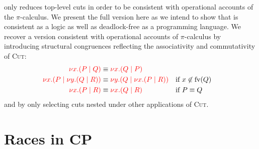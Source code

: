 \documentclass[a4paper,UKenglish]{lipics-v2016}
\begin{document}
only reduces top-level cuts in order to be consistent with operational
accounts of the $\pi$-calculus.
%
We present the full version here as we intend to show that \nodcap is consistent
as a logic as well as deadlock-free as a programming language.
%
We recover a version consistent with operational accounts of $\pi$-calculus by
introducing structural congruences reflecting the associativity and
commutativity of \textsc{Cut}:
\begin{align*}
  \textcolor{red}{{\nu x.} (P \mid Q)} &\equiv \textcolor{red}{{\nu x.} (Q \mid P)} \\
  \textcolor{red}{{\nu x.} (P \mid {\ensuremath{\nu y.}} (Q \mid R))} &\equiv \textcolor{red}{{\nu y.} (Q \mid {\ensuremath{\nu x.}} (P \mid R))} && \text{if $x \not\in \text{fv}(Q)$} \\
  \textcolor{red}{{\nu x.} (P \mid R)} &\equiv \textcolor{red}{{\nu x.} (Q \mid R)} &&\text{if $P \equiv Q$}
\end{align*}
and by only selecting cuts nested under other applications of \textsc{Cut}.

%
%




\section{Races in CP}
\label{sec:races}

\end{document}
